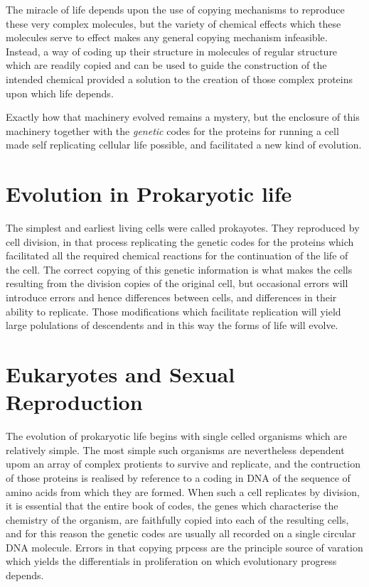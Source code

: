 {The miracle of life depends upon the use of copying mechanisms to reproduce these very complex molecules, but the variety of chemical effects which these molecules serve to effect makes any general copying mechanism infeasible.
Instead, a way of coding up their structure in molecules of regular structure which are readily copied and can be used to guide the construction of the intended chemical provided a solution to the creation of those complex proteins upon which life depends.

Exactly how that machinery evolved remains a mystery, but the enclosure of this machinery together with the \emph{genetic} codes for the proteins for running a cell made self replicating cellular life possible, and facilitated a new kind of evolution.

\section{Evolution in Prokaryotic life}

The simplest and earliest living cells were called prokayotes.
They reproduced by cell division, in that process replicating the genetic codes for the proteins which facilitated all the required chemical reactions for the continuation of the life of the cell.
The correct copying of this genetic information is what makes the cells resulting from the division copies of the original cell, but occasional errors will introduce errors and hence differences between cells, and differences in their ability to replicate.
Those modifications which facilitate replication will yield large polulations of descendents and in this way the forms of life will evolve.

\section{Eukaryotes and Sexual Reproduction}

The evolution of prokaryotic life begins with single celled organisms which are relatively simple.
The most simple such organisms are nevertheless dependent upom an array of complex protients to survive and replicate, and the contruction of those proteins is realised by reference to a coding in DNA of the sequence of amino acids from which they are formed.
When such a cell replicates by division, it is essential that the entire book of codes, the genes which characterise the chemistry of the organism, are faithfully copied into each of the resulting cells, and for this reason the genetic codes are usually all recorded on a single circular DNA molecule.
Errors in that copying prpcess are the principle source of varation which yields the differentials in proliferation on which evolutionary progress depends.

}
